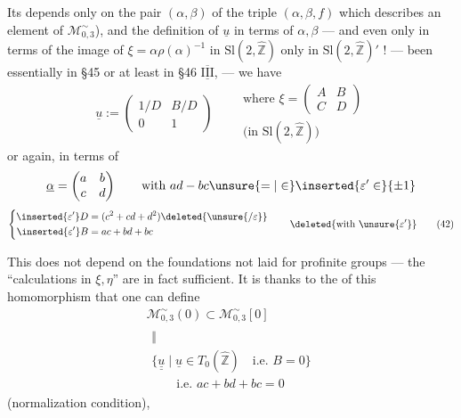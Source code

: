 
Its   depends only on the pair
$(\alpha,\beta)$  of the triple $(\alpha,\beta,f)$
which describes an element of $\mathcal M_{0,3}^{\sim}$), and
the  definition of $\underline u$ in terms of
$\alpha,\beta$ --- and even only in terms
of the image of $\xi=\alpha\rho(\alpha)^{-1}$ in
$\mathrm{Sl}(2,\widehat{\mathbb Z})$
 only in
$\mathrm{Sl}(2,\widehat{\mathbb Z})'$ ! ---
 been  essentially in \S45
or at least in \S46 $\overline{\underline{\mathrm{III}}}$, --- we have
\[
\underline u:=\begin{pmatrix}1/D&B/D\\0&1\end{pmatrix}
\qquad\begin{gathered}
\text{where }\xi=\begin{pmatrix}A&B\\C&D\end{pmatrix}\\
\text{(in }\mathrm{Sl}(2,\widehat{\mathbb Z})\text{)}
\end{gathered}
\tag{41}
\]
or again, in terms of
\[
\underline\alpha=\begin{pmatrix}a&b\\c&d\end{pmatrix}
\qquad\text{with }ad-bc\unsure{=|\in}\inserted{\varepsilon'\in}\{\pm1\}
\]
\[
\left\{\begin{aligned}
\inserted{\varepsilon'}D&=(c^2+cd+d^2)\deleted{\unsure{/\varepsilon}}\\
\inserted{\varepsilon'}B&=ac+bd+bc
\end{aligned}\right.
\qquad\deleted{\text{with }\unsure{\varepsilon'}}
\tag{42}
\]

This does not depend on the foundations not laid for profinite groups ---
the ``calculations in $\xi,\eta$'' are in fact sufficient.
It is thanks to the  of this homomorphism
that one can define
\[
\begin{gathered}
\mathcal M_{0,3}^{\sim}(0)\subset\mathcal M_{0,3}^{\sim}[0]\\
\begin{array}{c}
\Vert\\
\{\underline{\underline u}\mid\underline u\in T_0(\widehat{\mathbb Z})
\quad\text{i.e. }B=0\}\\
\qquad\text{i.e. }ac+bd+bc=0
\end{array}
\end{gathered}
\tag{43}
\]
(normalization condition),


